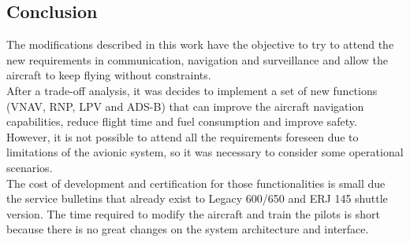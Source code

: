 \begin{figure}[H] %
\label{fig:AVIOCostSum2}
\end{figure}


\subsection{Conclusion}

The modifications described in this work have the objective to try to attend the new requirements in communication, navigation and surveillance and allow  the aircraft to keep flying without constraints.
\\After a trade-off analysis, it was decides to implement a set of new functions (VNAV, RNP, LPV and ADS-B) that can improve the aircraft navigation capabilities, reduce flight time and fuel consumption and improve safety. However, it is not possible to attend all the requirements foreseen due to limitations of the avionic system, so it was necessary to consider some operational scenarios.
\\The cost of development and certification for those functionalities is small due the service bulletins that already exist to Legacy 600/650 and ERJ 145 shuttle version. The time required to modify the aircraft and train the pilots is short because there is no great changes on the system architecture and interface.










